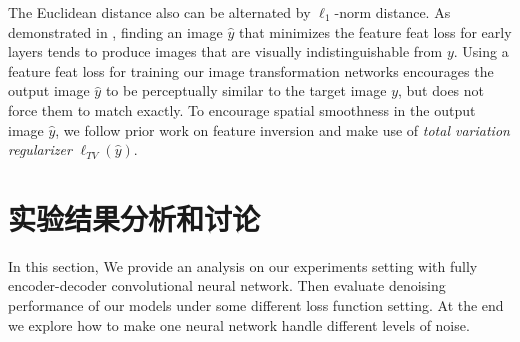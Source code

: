 The Euclidean distance also can be alternated by $\ell_{1}$-norm distance. As demonstrated in \cite{Mahendran2015}, finding an image $\hat y$ that minimizes the feature
feat loss for early layers tends to produce images that are visually indistinguishable from $y$. 
Using a feature feat loss for training our image transformation networks encourages
the output image $\hat y$ to be perceptually similar to the target image $y$, but does not force them to match exactly.
To encourage spatial smoothness in the output image $\hat y$, we
follow prior work on feature inversion \cite{Mahendran2015} and make use of \emph{total variation regularizer} $\ell_{TV}(\hat y)$.
 
\section{实验结果分析和讨论}
\label{sec:experiments-results}

In this section, We provide an analysis on our experiments setting with fully encoder-decoder convolutional neural network. Then evaluate denoising performance of our models under some different loss function setting. At the end we explore how to make one neural network handle different levels of noise.
